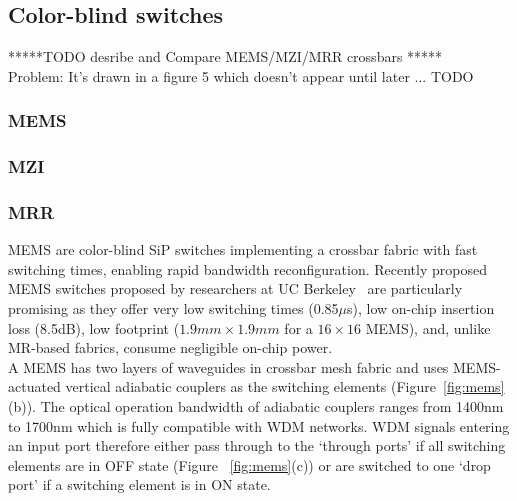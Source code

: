 \subsection{Color-blind switches}
*****TODO desribe and Compare MEMS/MZI/MRR crossbars *****\\
Problem: It's drawn in a figure 5 which doesn't appear until later ... TODO \\ 
\subsubsection{MEMS}
\subsubsection{MZI}
\subsubsection{MRR}
MEMS are color-blind SiP switches implementing a crossbar fabric with fast switching times, enabling rapid bandwidth reconfiguration. %
Recently proposed MEMS switches proposed by researchers at UC Berkeley~\cite{seok2016highly} are particularly promising as they offer very low switching times (0.85$\mu$s), low on-chip insertion loss (8.5dB), low footprint ($1.9mm \times 1.9mm$ for a $16 \times 16$ MEMS), and, unlike MR-based fabrics, consume negligible on-chip power. \\
A MEMS has two layers of waveguides in crossbar mesh fabric and uses MEMS-actuated vertical adiabatic couplers as the switching elements (Figure~\ref{fig:mems}(b)). The optical operation bandwidth of adiabatic couplers ranges from 1400nm to 1700nm which is fully compatible with WDM networks. WDM signals entering an input port therefore either pass through to the `through ports' if all switching elements are in OFF state (Figure~ \ref{fig:mems}(c)) or are switched to one `drop port' if a switching element is in ON state.  \\
